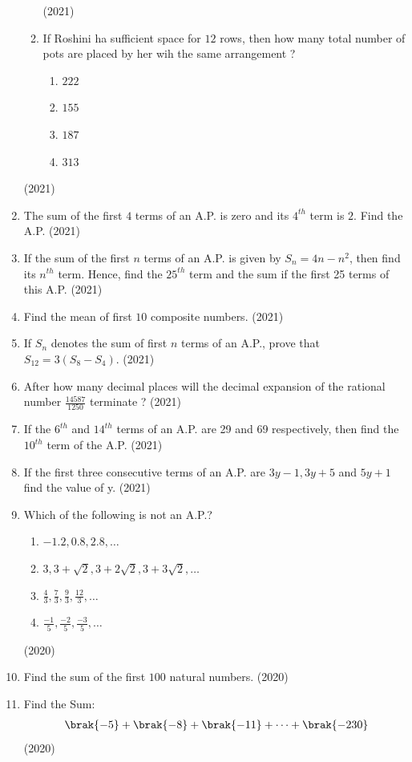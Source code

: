 \begin{enumerate}[label=\thesubsection.\arabic*,ref=\thesubsection.\theenumi,itemsep=1pt]
\begin{enumerate}[label=(\roman*)]
			\hfill (2021) \item If Roshini ha sufficient space for $12$ rows, then how many total number of pots are placed by her wih the same arrangement ?
				\begin{enumerate}[label=\Alph*]
					 \item $222$
					 \item $155$
					 \item $187$
					 \item $313$
				\end{enumerate}
		\end{enumerate} 
\hfill (2021)
	 \item The sum of the first $4$ terms of an A.P. is zero and its $4^{th}$ term is $2$. Find the A.P.
	\hfill (2021) \item If the sum of the first $n$ terms of an A.P. is given by $S_n = 4n - n^2$, then find its $n^{th}$ term. Hence, find the $25^{th}$ term and the sum if the first 25 terms of this A.P.
\hfill (2021)
	 \item Find the mean of first $10$ composite numbers.
	\hfill (2021) \item If $S_n$ denotes the sum of first $n$ terms of an A.P., prove that $S_{12} = 3(S_8 - S_4)$.
	\hfill (2021) \item After how many decimal places will the decimal expansion of the rational number $\frac{14587}{1250}$ terminate ?			
\hfill (2021)
	 \item If the $6^{th}$ and $14^{th}$ terms of an A.P. are 29 and 69 respectively, then find the $10^{th}$ term of the A.P.
	\hfill (2021) \item If the first three consecutive terms of an A.P. are $3y-1, 3y+5$ and $5y+1$ find the value of y. 
\hfill (2021)
 \item Which of the following is not an A.P.? 
\begin{enumerate}[label =(\Alph*)]
               \item $-1.2,0.8,2.8,\dots$ 
	        \item $3,3+\sqrt2,3+2\sqrt2,3+3\sqrt2,\dots$ 
	        \item $\frac{4}{3},\frac{7}{3},\frac{9}{3},\frac{12}{3},\dots$ 
	        \item $\frac{-1}{5},\frac{-2}{5},\frac{-3}{5},\dots$ 
\end{enumerate}

\hfill (2020) \item Find the sum of the first $100$ natural numbers.	
	\hfill (2020)
 \item Find the Sum:
\begin{align*}
	\brak{-5} + \brak{-8} + \brak{-11} + \dots + \brak{-230}
\end{align*}
\hfill (2020)


\end{enumerate}
